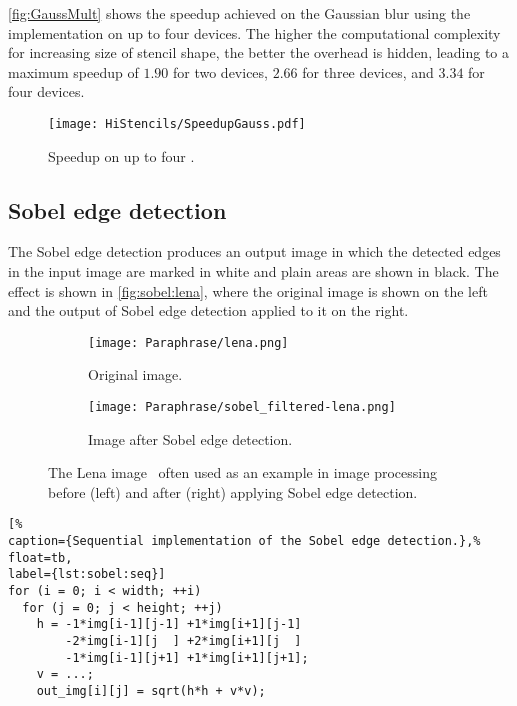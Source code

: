 \autoref{fig:GaussMult} shows the speedup achieved on the Gaussian blur using the  implementation on up to four devices.
The higher the computational complexity for increasing size of stencil shape, the better the overhead is hidden, leading to a maximum speedup of $1.90$ for two devices, $2.66$ for three devices, and $3.34$ for four devices.
\begin{figure}
	\centering
	\texttt{[image: HiStencils/SpeedupGauss.pdf]}
	\caption{Speedup on up to four \GPUs.}
	\label{fig:GaussMult}
\end{figure} 










\subsection{Sobel edge detection}
\label{sec:sobel}
The Sobel edge detection produces an output image in which the detected edges in the input image are marked in white and plain areas are shown in black.
The effect is shown in \autoref{fig:sobel:lena}, where the original image is shown on the left and the output of Sobel edge detection applied to it on the right.

\begin{figure}[tb]
  \centering
  \begin{subfigure}[t]{.45\textwidth}
    \texttt{[image: Paraphrase/lena.png]}
    \caption{Original image.}
    \label{fig:lena:orig}
  \end{subfigure}
  \hfill
  \begin{subfigure}[t]{.45\textwidth}
    \texttt{[image: Paraphrase/sobel\_filtered-lena.png]}
    \caption{Image after Sobel edge detection.}
    \label{fig:lena:sobel}
  \end{subfigure}
  \caption{The Lena image~\cite{Lena} often used as an example in image processing before (left) and after (right) applying Sobel edge detection.}
  \label{fig:sobel:lena}
\end{figure}

\begin{lstlisting}[%
caption={Sequential implementation of the Sobel edge detection.},%
float=tb,
label={lst:sobel:seq}]
for (i = 0; i < width; ++i)
  for (j = 0; j < height; ++j)
    h = -1*img[i-1][j-1] +1*img[i+1][j-1]
        -2*img[i-1][j  ] +2*img[i+1][j  ]
        -1*img[i-1][j+1] +1*img[i+1][j+1];
    v = ...;
    out_img[i][j] = sqrt(h*h + v*v);
\end{lstlisting}
\bigskip

